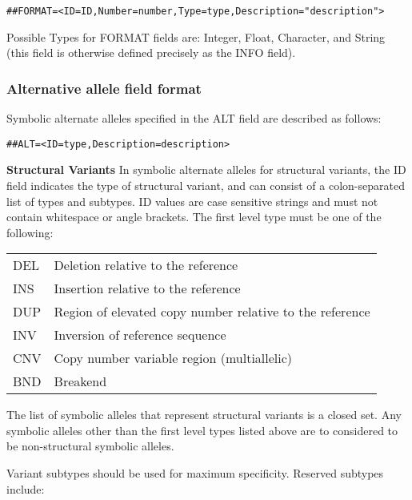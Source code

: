 \documentclass[8pt]{article}
\begin{document}
\begin{verbatim}
##FORMAT=<ID=ID,Number=number,Type=type,Description="description">
\end{verbatim}

Possible Types for FORMAT fields are: Integer, Float, Character, and String (this field is otherwise defined precisely as the INFO field).

\subsubsection{Alternative allele field format}
Symbolic alternate alleles specified in the ALT field are described as follows:
\begin{verbatim}
##ALT=<ID=type,Description=description>
\end{verbatim}

\noindent \textbf{Structural Variants} \newline
In symbolic alternate alleles for structural variants, the ID field indicates the type of structural variant, and can consist of a colon-separated list of types and subtypes. ID values are case sensitive strings and must not contain whitespace or angle brackets. The first level type must be one of the following:\newline

\begin{tabular}{l l}
DEL  &  Deletion relative to the reference \\
INS  &  Insertion relative to the reference \\
DUP  &  Region of elevated copy number relative to the reference \\
INV  &  Inversion of reference sequence \\
CNV  &  Copy number variable region (multiallelic) \\
BND  &  Breakend \\
\end{tabular}
\newline
The list of symbolic alleles that represent structural variants is a closed set. Any symbolic alleles other than the first level types listed above are to considered to be non-structural symbolic alleles.

\noindent Variant subtypes should be used for maximum specificity. Reserved subtypes include:
\newline
\end{document}

